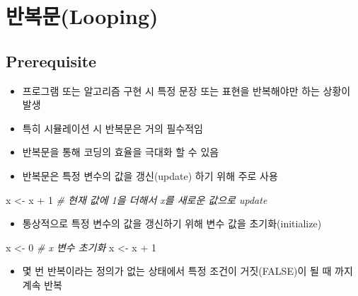 \documentclass[
  11pt,
]{krantz}
\newenvironment{Shaded}{\begin{snugshade}}{\end{snugshade}}
\newcommand{\CommentTok}[1]{\textcolor[rgb]{0.37,0.37,0.37}{\textit{#1}}}
\newcommand{\DecValTok}[1]{\textcolor[rgb]{0.06,0.06,0.06}{#1}}
\newcommand{\NormalTok}[1]{#1}
\newcommand{\OtherTok}[1]{\textcolor[rgb]{0.37,0.37,0.37}{#1}}
\newcommand{\SpecialCharTok}[1]{\textcolor[rgb]{0,0,0}{#1}}
\providecommand{\tightlist}{%
  \setlength{\itemsep}{0pt}\setlength{\parskip}{0pt}}
\begin{document}
\normalsize

\hypertarget{looping}{%
\section{반복문(Looping)}\label{looping}}

\hypertarget{loop-pre}{%
\subsection*{Prerequisite}\label{loop-pre}}


\begin{itemize}
\tightlist
\item
  프로그램 또는 알고리즘 구현 시 특정 문장 또는 표현을 반복해야만 하는 상황이 발생
\item
  특히 시뮬레이션 시 반복문은 거의 필수적임
\item
  반복문을 통해 코딩의 효율을 극대화 할 수 있음
\item
  반복문은 특정 변수의 값을 갱신(update) 하기 위해 주로 사용
\end{itemize}

\footnotesize

\begin{Shaded}
\begin{Highlighting}[]
\NormalTok{x }\OtherTok{\textless{}{-}}\NormalTok{ x }\SpecialCharTok{+} \DecValTok{1} \CommentTok{\# 현재 값에 1을 더해서 x를 새로운 값으로 update}
\end{Highlighting}
\end{Shaded}

\normalsize

\begin{itemize}
\tightlist
\item
  통상적으로 특정 변수의 값을 갱신하기 위해 변수 값을 초기화(initialize)
\end{itemize}

\footnotesize

\begin{Shaded}
\begin{Highlighting}[]
\NormalTok{x }\OtherTok{\textless{}{-}} \DecValTok{0} \CommentTok{\# x 변수 초기화}
\NormalTok{x }\OtherTok{\textless{}{-}}\NormalTok{ x }\SpecialCharTok{+} \DecValTok{1}
\end{Highlighting}
\end{Shaded}

\normalsize

\begin{itemize}
\tightlist
\item
  몇 번 반복이라는 정의가 없는 상태에서 특정 조건이 거짓(FALSE)이 될 때 까지 계속 반복
\end{itemize}
\end{document}
